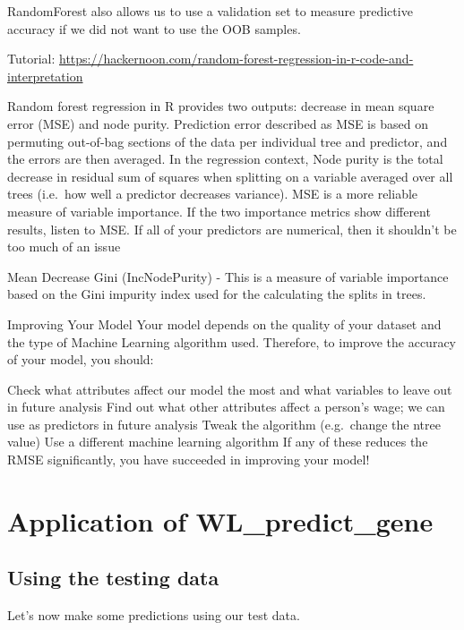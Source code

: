 \documentclass[
]{article}
\begin{document}
RandomForest also allows us to use a validation set to measure
predictive accuracy if we did not want to use the OOB samples.

Tutorial:
\url{https://hackernoon.com/random-forest-regression-in-r-code-and-interpretation}

Random forest regression in R provides two outputs: decrease in mean
square error (MSE) and node purity. Prediction error described as MSE is
based on permuting out-of-bag sections of the data per individual tree
and predictor, and the errors are then averaged. In the regression
context, Node purity is the total decrease in residual sum of squares
when splitting on a variable averaged over all trees (i.e.~how well a
predictor decreases variance). MSE is a more reliable measure of
variable importance. If the two importance metrics show different
results, listen to MSE. If all of your predictors are numerical, then it
shouldn't be too much of an issue

Mean Decrease Gini (IncNodePurity) - This is a measure of variable
importance based on the Gini impurity index used for the calculating the
splits in trees.

Improving Your Model Your model depends on the quality of your dataset
and the type of Machine Learning algorithm used. Therefore, to improve
the accuracy of your model, you should:

Check what attributes affect our model the most and what variables to
leave out in future analysis Find out what other attributes affect a
person's wage; we can use as predictors in future analysis Tweak the
algorithm (e.g.~change the ntree value) Use a different machine learning
algorithm If any of these reduces the RMSE significantly, you have
succeeded in improving your model!

\hypertarget{application-of-wl_predict_gene}{%
\section{Application of
WL\_predict\_gene}\label{application-of-wl_predict_gene}}

\hypertarget{using-the-testing-data}{%
\subsection{Using the testing data}\label{using-the-testing-data}}

Let's now make some predictions using our test data.
\end{document}
